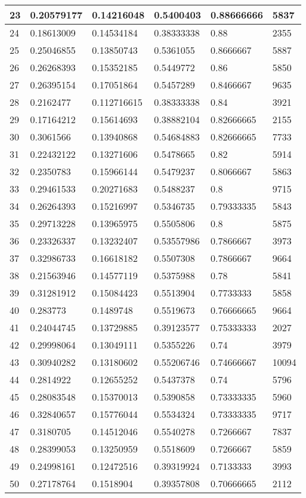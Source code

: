 \begin{longtable}{|l|l|l|l|l|l|}
23 & 0.20579177 & 0.14216048 & 0.5400403 & 0.88666666 & 5837 \\ \hline 
24 & 0.18613009 & 0.14534184 & 0.38333338 & 0.88 & 2355 \\ \hline 
25 & 0.25046855 & 0.13850743 & 0.5361055 & 0.8666667 & 5887 \\ \hline 
26 & 0.26268393 & 0.15352185 & 0.5449772 & 0.86 & 5850 \\ \hline 
27 & 0.26395154 & 0.17051864 & 0.5457289 & 0.8466667 & 9635 \\ \hline 
28 & 0.2162477 & 0.112716615 & 0.38333338 & 0.84 & 3921 \\ \hline 
29 & 0.17164212 & 0.15614693 & 0.38882104 & 0.82666665 & 2155 \\ \hline 
30 & 0.3061566 & 0.13940868 & 0.54684883 & 0.82666665 & 7733 \\ \hline 
31 & 0.22432122 & 0.13271606 & 0.5478665 & 0.82 & 5914 \\ \hline 
32 & 0.2350783 & 0.15966144 & 0.5479237 & 0.8066667 & 5863 \\ \hline 
33 & 0.29461533 & 0.20271683 & 0.5488237 & 0.8 & 9715 \\ \hline 
34 & 0.26264393 & 0.15216997 & 0.5346735 & 0.79333335 & 5843 \\ \hline 
35 & 0.29713228 & 0.13965975 & 0.5505806 & 0.8 & 5875 \\ \hline 
36 & 0.23326337 & 0.13232407 & 0.53557986 & 0.7866667 & 3973 \\ \hline 
37 & 0.32986733 & 0.16618182 & 0.5507308 & 0.7866667 & 9664 \\ \hline 
38 & 0.21563946 & 0.14577119 & 0.5375988 & 0.78 & 5841 \\ \hline 
39 & 0.31281912 & 0.15084423 & 0.5513904 & 0.7733333 & 5858 \\ \hline 
40 & 0.283773 & 0.1489748 & 0.5519673 & 0.76666665 & 9664 \\ \hline 
41 & 0.24044745 & 0.13729885 & 0.39123577 & 0.75333333 & 2027 \\ \hline 
42 & 0.29998064 & 0.13049111 & 0.5355226 & 0.74 & 3979 \\ \hline 
43 & 0.30940282 & 0.13180602 & 0.55206746 & 0.74666667 & 10094 \\ \hline 
44 & 0.2814922 & 0.12655252 & 0.5437378 & 0.74 & 5796 \\ \hline 
45 & 0.28083548 & 0.15370013 & 0.5390858 & 0.73333335 & 5960 \\ \hline 
46 & 0.32840657 & 0.15776044 & 0.5534324 & 0.73333335 & 9717 \\ \hline 
47 & 0.3180705 & 0.14512046 & 0.5540278 & 0.7266667 & 7837 \\ \hline 
48 & 0.28399053 & 0.13250959 & 0.5518609 & 0.7266667 & 5859 \\ \hline 
49 & 0.24998161 & 0.12472516 & 0.39319924 & 0.7133333 & 3993 \\ \hline 
50 & 0.27178764 & 0.1518904 & 0.39357808 & 0.70666665 & 2112 \\ \hline 
\end{longtable}